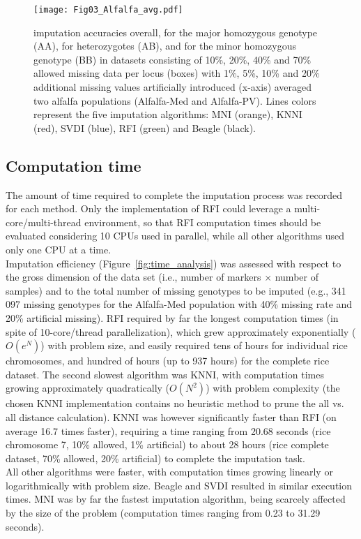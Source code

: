 \begin{figure}
\texttt{[image: Fig03\_Alfalfa\_avg.pdf]}
\caption[Alfalfa imputation accuracies]{
imputation accuracies overall, for the major homozygous genotype (AA), for heterozygotes (AB), and for the minor homozygous genotype (BB) in datasets consisting of 10\%, 20\%, 40\% and 70\% allowed missing data per locus (boxes) with 1\%, 5\%, 10\% and 20\% additional missing values artificially introduced (x-axis) averaged two alfalfa populations (Alfalfa-Med and Alfalfa-PV). Lines colors represent the five imputation algorithms: MNI (orange), KNNI (red), SVDI (blue), RFI (green) and Beagle (black).}
\label{fig:accuracy_alfalfa}
\end{figure}

\subsection{Computation time}
\label{sec:computation_time}  
The amount of time required to complete the imputation process was recorded for each method. Only the implementation of RFI could leverage a multi-core/multi-thread environment, so that RFI computation times should be evaluated considering 10 CPUs used in parallel, while all other algorithms used only one CPU at a time.\\
Imputation efficiency (Figure~\ref{fig:time_analysis}) was assessed with respect to the gross dimension of the data set (i.e., number of markers $\times$ number of samples) and to the total number of missing genotypes to be imputed (e.g., 341\,097 missing genotypes for the Alfalfa-Med population with 40\% missing rate and 20\% artificial missing).
RFI required by far the longest computation times (in spite of 10-core/thread parallelization), which grew approximately exponentially ($O(e^N)$) with problem size, and easily required tens of hours for individual rice chromosomes, and hundred of hours (up to 937 hours) for the complete rice dataset. The second slowest algorithm was KNNI, with computation times growing approximately quadratically ($O(N^2)$) with problem complexity (the chosen KNNI implementation contains no heuristic method to prune the all vs. all distance calculation). KNNI was however significantly faster than RFI (on average 16.7 times faster), requiring a time ranging from 20.68 seconds (rice chromosome 7, 10\% allowed, 1\% artificial) to about 28 hours (rice complete dataset, 70\% allowed, 20\% artificial) to complete the imputation task.\\
All other algorithms were faster, with computation times growing linearly or logarithmically with problem size. Beagle and SVDI resulted in similar execution times. MNI was by far the fastest imputation algorithm, being scarcely affected by the size of the problem (computation times ranging from 0.23 to 31.29 seconds).

